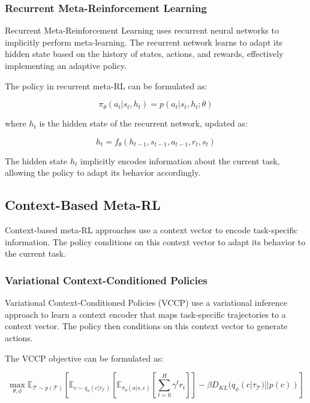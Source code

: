 \documentclass{article}
\begin{document}
\subsubsection{Recurrent Meta-Reinforcement Learning}

Recurrent Meta-Reinforcement Learning uses recurrent neural networks to implicitly perform meta-learning. The recurrent network learns to adapt its hidden state based on the history of states, actions, and rewards, effectively implementing an adaptive policy.

The policy in recurrent meta-RL can be formulated as:

\begin{equation}
\pi_\theta(a_t | s_t, h_t) = p(a_t | s_t, h_t; \theta)
\end{equation}

where $h_t$ is the hidden state of the recurrent network, updated as:

\begin{equation}
h_t = f_\theta(h_{t-1}, s_{t-1}, a_{t-1}, r_t, s_t)
\end{equation}

The hidden state $h_t$ implicitly encodes information about the current task, allowing the policy to adapt its behavior accordingly.

\subsection{Context-Based Meta-RL}

Context-based meta-RL approaches use a context vector to encode task-specific information. The policy conditions on this context vector to adapt its behavior to the current task.

\subsubsection{Variational Context-Conditioned Policies}

Variational Context-Conditioned Policies (VCCP) use a variational inference approach to learn a context encoder that maps task-specific trajectories to a context vector. The policy then conditions on this context vector to generate actions.

The VCCP objective can be formulated as:

\begin{equation}
\max_{\theta, \phi} \mathbb{E}_{\mathcal{T} \sim p(\mathcal{T})} \left[ \mathbb{E}_{c \sim q_\phi(c | \tau_{\mathcal{T}})} \left[ \mathbb{E}_{\pi_\theta(a|s,c)} \left[ \sum_{t=0}^{H} \gamma^t r_t \right] \right] - \beta D_{KL}(q_\phi(c | \tau_{\mathcal{T}}) || p(c)) \right]
\end{equation}
\end{document}

